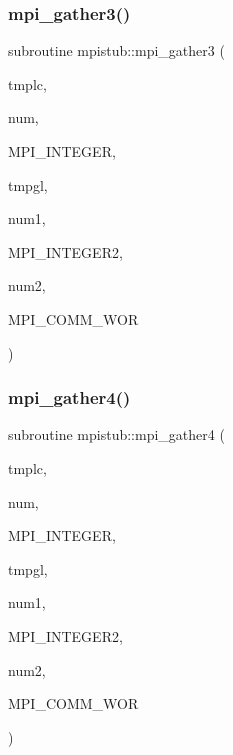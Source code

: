 \mbox{\label{namespacempistub_a4a5262ac6eca022843c0cd39b508e35f}} 
\subsubsection{\texorpdfstring{mpi\_gather3()}{mpi\_gather3()}}
{\footnotesize\ttfamily subroutine mpistub\+::mpi\+\_\+gather3 (\begin{DoxyParamCaption}\item[{integer, dimension(\+:)}]{tmplc,  }\item[{}]{num,  }\item[{}]{M\+P\+I\+\_\+\+I\+N\+T\+E\+G\+ER,  }\item[{integer, dimension(\+:)}]{tmpgl,  }\item[{}]{num1,  }\item[{}]{M\+P\+I\+\_\+\+I\+N\+T\+E\+G\+E\+R2,  }\item[{}]{num2,  }\item[{}]{M\+P\+I\+\_\+\+C\+O\+M\+M\+\_\+\+W\+OR }\end{DoxyParamCaption})}

\mbox{\label{namespacempistub_a6c7b2f5337f97885b72a76ec35729075}} 
\subsubsection{\texorpdfstring{mpi\_gather4()}{mpi\_gather4()}}
{\footnotesize\ttfamily subroutine mpistub\+::mpi\+\_\+gather4 (\begin{DoxyParamCaption}\item[{integer}]{tmplc,  }\item[{}]{num,  }\item[{}]{M\+P\+I\+\_\+\+I\+N\+T\+E\+G\+ER,  }\item[{integer, dimension(\+:)}]{tmpgl,  }\item[{}]{num1,  }\item[{}]{M\+P\+I\+\_\+\+I\+N\+T\+E\+G\+E\+R2,  }\item[{}]{num2,  }\item[{}]{M\+P\+I\+\_\+\+C\+O\+M\+M\+\_\+\+W\+OR }\end{DoxyParamCaption})}

\mbox{\label{namespacempistub_af6819ee02570b8c8bef94e79e67a4af9}} 
